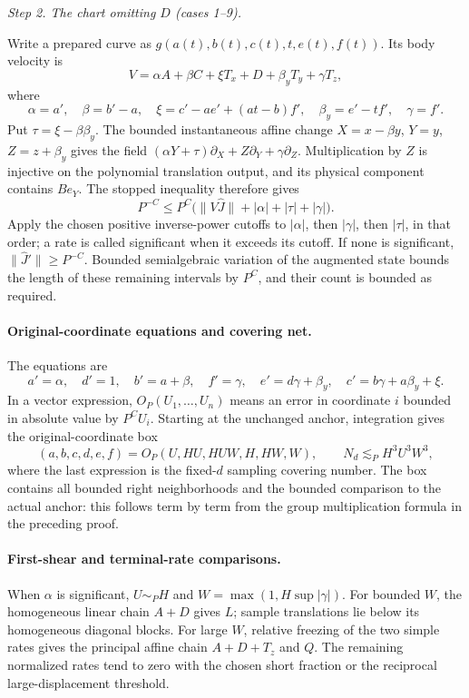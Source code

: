 \documentclass[11pt]{amsart}
\theoremstyle{definition}
\theoremstyle{remark}
\numberwithin{equation}{section}
\begin{document}
\par\medskip\noindent{}\textit{Step 2. The chart omitting $D$ (cases 1--9).}\label{reg:d-channels}\par\nobreak\smallskip
Write a prepared curve as $g(a(t),b(t),c(t),t,e(t),f(t))$. Its body velocity is
\[
V=\alpha A+\beta C+\xi T_x+D+\beta_yT_y+\gamma T_z,
\]
where
\[
\alpha=a',\quad \beta=b'-a,\quad \xi=c'-ae'+(at-b)f',\quad \beta_y=e'-tf',\quad \gamma=f'.
\]
Put $\tau=\xi-\beta\beta_y$. The bounded instantaneous affine change $X=x-\beta y$, $Y=y$, $Z=z+\beta_y$ gives the field $(\alpha Y+\tau)\partial_X+Z\partial_Y+\gamma\partial_Z$. Multiplication by $Z$ is injective on the polynomial translation output, and its physical component contains $Be_Y$. The stopped inequality therefore gives
\[
P^{-C}\le P^C\bigl(\|V\widehat J\|+|\alpha|+|\tau|+|\gamma|\bigr).
\]
Apply the chosen positive inverse-power cutoffs to $|\alpha|$, then $|\gamma|$, then $|\tau|$, in that order; a rate is called significant when it exceeds its cutoff. If none is significant, $\|\widehat J'\|\ge P^{-C}$. Bounded semialgebraic variation of the augmented state bounds the length of these remaining intervals by $P^C$, and their count is bounded as required.

\paragraph{Original-coordinate equations and covering net.}
The equations are
\begin{equation}\label{reg:d-equations}
a'=\alpha,\quad d'=1,\quad b'=a+\beta,\quad f'=\gamma,\quad e'=d\gamma+\beta_y,\quad c'=b\gamma+a\beta_y+\xi.
\end{equation}
In a vector expression, $O_P(U_1,\ldots,U_n)$ means an error in coordinate $i$ bounded in absolute value by $P^CU_i$. Starting at the unchanged anchor, integration gives the original-coordinate box
\begin{equation}\label{reg:d-box}
(a,b,c,d,e,f)=O_P(U,HU,HUW,H,HW,W),\qquad N_d\lesssim_P H^3U^3W^3,
\end{equation}
where the last expression is the fixed-$d$ sampling covering number. The box contains all bounded right neighborhoods and the bounded comparison to the actual anchor: this follows term by term from the group multiplication formula in the preceding proof.

\paragraph{First-shear and terminal-rate comparisons.}
When $\alpha$ is significant, $U\sim_PH$ and $W=\max(1,H\sup|\gamma|)$. For bounded $W$, the homogeneous linear chain $A+D$ gives $L$; sample translations lie below its homogeneous diagonal blocks. For large $W$, relative freezing of the two simple rates gives the principal affine chain $A+D+T_z$ and $Q$. The remaining normalized rates tend to zero with the chosen short fraction or the reciprocal large-displacement threshold.
\end{document}
